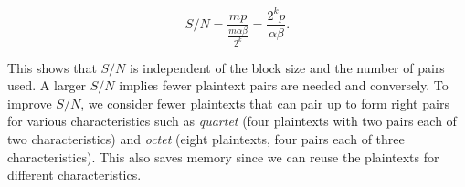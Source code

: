 \documentclass[twoside]{article}
\begin{document}
\begin{equation}
    S/N = \frac{mp}{\frac{m\alpha\beta}{2^k}} = \frac{2^kp}{\alpha\beta}.
\end{equation}

This shows that \(S/N\) is independent of the block size and the number of pairs
used. A larger \(S/N\) implies fewer plaintext pairs are needed and conversely.
To improve \(S/N\), we consider fewer plaintexts that can pair up to form right
pairs for various characteristics such as \emph{quartet} (four plaintexts with
two pairs each of two characteristics) and \emph{octet} (eight plaintexts, four
pairs each of three characteristics). This also saves memory since we can reuse
the plaintexts for different characteristics.
\end{document}
